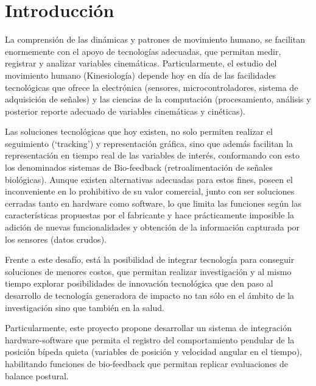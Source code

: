 \documentclass[12pt,a4paper]{article}
\begin{document}
\thispagestyle{empty}
\pagebreak
\setcounter{page}{1}

\let\stdsection\section
\renewcommand\section{\newpage\stdsection}

\section{Introducción}
La comprensión de las dinámicas y patrones de movimiento humano, se facilitan enormemente con el apoyo de tecnologías adecuadas, que permitan medir, registrar y analizar variables cinemáticas. Particularmente, el estudio del movimiento humano (Kinesiología) depende hoy en día de las facilidades tecnológicas que ofrece la electrónica (sensores, microcontroladores, sistema de adquisición de señales) y las ciencias de la computación (procesamiento, análisis y posterior reporte adecuado de  variables cinemáticas y cinéticas).  

Las soluciones tecnológicas que hoy existen, no solo permiten realizar el seguimiento (‘tracking’) y representación gráfica, sino que además facilitan la representación en tiempo real de las variables de interés, conformando con esto los denominados sistemas de Bio-feedback (retroalimentación de señales biológicas). Aunque existen alternativas adecuadas para estos fines, poseen el inconveniente en lo prohibitivo de su valor comercial, junto con ser soluciones cerradas tanto en hardware como software, lo que limita las funciones según las características propuestas por el fabricante y hace prácticamente imposible la adición de nuevas funcionalidades y obtención de la información capturada por los sensores (datos crudos).

Frente a este desafío, está la posibilidad de integrar tecnología para conseguir soluciones de menores costos, que permitan realizar investigación y al mismo tiempo explorar posibilidades de innovación tecnológica que den paso al desarrollo de tecnología generadora de impacto no tan sólo en el ámbito de la investigación sino que también en la salud.

Particularmente, este proyecto propone desarrollar un sistema de integración hardware-software que permita el registro del comportamiento pendular de la posición bípeda quieta (variables de posición y velocidad angular en el tiempo), habilitando funciones de bio-feedback que permitan replicar evaluaciones de balance postural.
\end{document}

